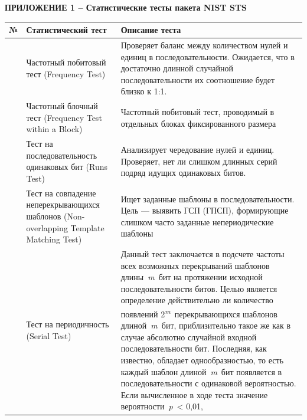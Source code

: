 \clearpage
\textbf{ПРИЛОЖЕНИЕ 1 -- Статистические тесты пакета NIST STS}

{\def\LTcaptype{none} %
\begin{longtable}[]{@{}|%
  >{\raggedright\arraybackslash}p{}|%
  >{\raggedright\arraybackslash}p{}|%
  >{\raggedright\arraybackslash}p{}|@{}}
\hline
\begin{minipage}[b]{\hsize}\raggedright
№
\end{minipage} & \begin{minipage}[b]{\hsize}\raggedright
Статистический тест
\end{minipage} & \begin{minipage}[b]{\hsize}\raggedright
Описание теста
\end{minipage} \\ \hline
\endhead
\endlastfoot
1 & Частотный побитовый тест (Frequency Test) & Проверяет баланс между
количеством нулей и единиц в последовательности. Ожидается, что в
достаточно длинной случайной последовательности их соотношение будет
близко к 1:1. \\ \hline
2 & Частотный блочный тест (Frequency Test within a Block) & Частотный
побитовый тест, проводимый в отдельных блоках фиксированного размера \\ \hline
3 & Тест на последовательность одинаковых бит (Runs Test) & Анализирует
чередование нулей и единиц. Проверяет, нет ли слишком длинных серий
подряд идущих одинаковых битов. \\ \hline
4 & Тест на совпадение неперекрывающихся шаблонов (Non-overlapping
Template Matching Test) & Ищет заданные шаблоны в последовательности.
Цель --- выявить ГСП (ГПСП), формирующие слишком часто заданные
непериодические шаблоны \\ \hline
5 & Тест на периодичность (Serial Test) & Данный тест заключается в
подсчете частоты всех возможных перекрываний шаблонов длины~\emph{m}~бит
на протяжении исходной последовательности битов. Целью является
определение действительно ли количество появлений
2\emph{\textsuperscript{m}}~перекрывающихся шаблонов
длиной~\emph{m}~бит, приблизительно такое же как в случае абсолютно
случайной входной последовательности бит. Последняя, как известно,
обладает однообразностью, то есть каждый шаблон длиной~\emph{m}~бит
появляется в последовательности с одинаковой вероятностью. Если
вычисленное в ходе теста значение вероятности~\emph{p}~\textless{} 0,01,

\end{longtable}}
